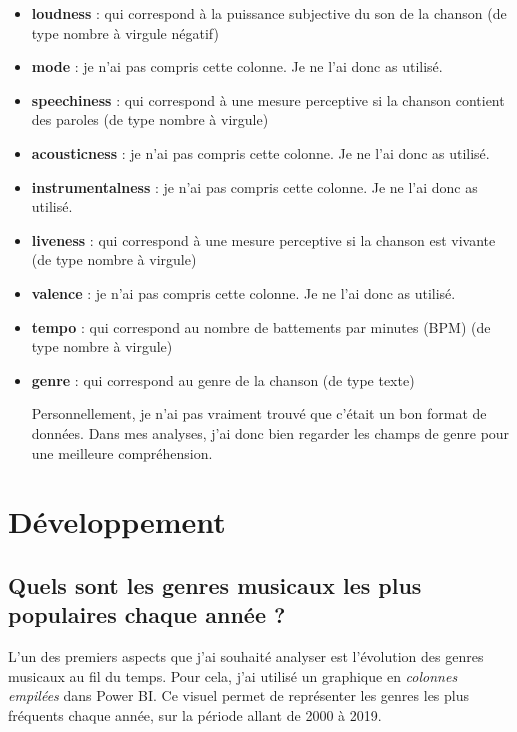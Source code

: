 \documentclass[french]{article}
\newcommand{\newLine}{\vspace{0.2cm}}
\begin{document}
\begin{itemize}
	\item \textbf{loudness} : qui correspond à la puissance subjective du son de la chanson (de type nombre à virgule négatif)
	\item \textbf{mode} : je n'ai pas compris cette colonne. Je ne l'ai donc as utilisé.
	\item \textbf{speechiness} : qui correspond à une mesure perceptive si la chanson contient des paroles (de type nombre à virgule)
	\item \textbf{acousticness} : je n'ai pas compris cette colonne. Je ne l'ai donc as utilisé.
	\item \textbf{instrumentalness} : je n'ai pas compris cette colonne. Je ne l'ai donc as utilisé.
	\item \textbf{liveness} : qui correspond à une mesure perceptive si la chanson est vivante (de type nombre à virgule)
	\item \textbf{valence} : je n'ai pas compris cette colonne. Je ne l'ai donc as utilisé.
	\item \textbf{tempo} : qui correspond au nombre de battements par minutes (BPM) (de type nombre à virgule)

	\item \textbf{genre} : qui correspond au genre de la chanson (de type texte)

	Personnellement, je n'ai pas vraiment trouvé que c'était un bon format de données. Dans mes analyses, j'ai donc bien regarder les champs de genre pour une meilleure compréhension.
\end{itemize}

\clearpage

\section{Développement}



\subsection{Quels sont les genres musicaux les plus populaires chaque année ?}

L'un des premiers aspects que j'ai souhaité analyser est l'évolution des genres musicaux au fil du temps. Pour cela, j'ai utilisé un graphique en \textit{colonnes empilées} dans Power BI. Ce visuel permet de représenter les genres les plus fréquents chaque année, sur la période allant de 2000 à 2019. \newLine
\end{document}
